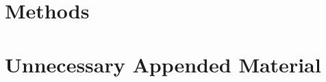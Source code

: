 \documentclass{kththesis}
\begin{document}
\chapter{Methods}

\lipsum



\appendix

\chapter{Unnecessary Appended Material}
\end{document}
